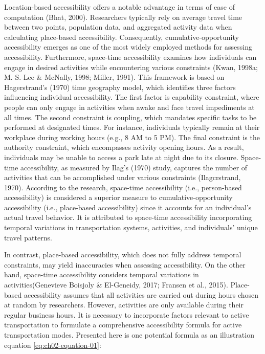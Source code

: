 \documentclass[
11pt, %
oneside, %
english, %
singlespacing, %
]{macthesis} %
\begin{document}
Location-based accessibility offers a notable advantage in terms of ease of computation (Bhat, 2000). Researchers typically rely on average travel time between two points, population data, and aggregated activity data when calculating place-based accessibility. Consequently, cumulative-opportunity accessibility emerges as one of the most widely employed methods for assessing accessibility. Furthermore, space-time accessibility examines how individuals can engage in desired activities while encountering various constraints (Kwan, 1998a; M. S. Lee \& McNally, 1998; Miller, 1991). This framework is based on Hagerstrand's (1970) time geography model, which identifies three factors influencing individual accessibility. The first factor is capability constraint, where people can only engage in activities when awake and face travel impediments at all times. The second constraint is coupling, which mandates specific tasks to be performed at designated times. For instance, individuals typically remain at their workplace during working hours (e.g., 8 AM to 5 PM). The final constraint is the authority constraint, which encompasses activity opening hours. As a result, individuals may be unable to access a park late at night due to its closure. Space-time accessibility, as measured by Ilag's (1970) study, captures the number of activities that can be accomplished under various constraints (Ilagcrstrand, 1970). According to the research, space-time accessibility (i.e., person-based accessibility) is considered a superior measure to cumulative-opportunity accessibility (i.e., place-based accessibility) since it accounts for an individual's actual travel behavior. It is attributed to space-time accessibility incorporating temporal variations in transportation systems, activities, and individuals' unique travel patterns.

In contrast, place-based accessibility, which does not fully address temporal constraints, may yield inaccuracies when assessing accessibility. On the other hand, space-time accessibility considers temporal variations in activities(Genevieve Boisjoly \& El-Geneidy, 2017; Fransen et al., 2015). Place-based accessibility assumes that all activities are carried out during hours chosen at random by researchers. However, activities are only available during their regular business hours. It is necessary to incorporate factors relevant to active transportation to formulate a comprehensive accessibility formula for active transportation modes. Presented here is one potential formula as an illustration equation \ref{eq:ch02-equation-01}:
\end{document}
